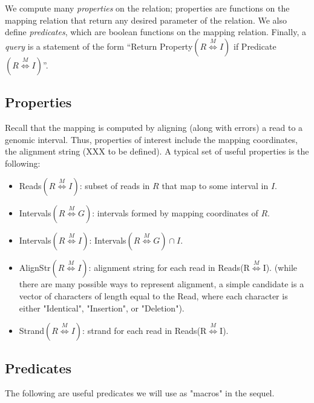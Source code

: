 \documentclass[10pt,fullpage]{article}
\newcommand{\MapRel}{\ensuremath{\stackrel{M}{\Leftrightarrow}}}
\begin{document}
We compute many \emph{properties} on the relation; properties
are functions on the mapping relation that return any desired
parameter of the relation.  
We also define \emph{predicates}, which are boolean functions on 
the mapping relation. Finally, a
\emph{query} is a statement of the form ``Return {\sc
  Property}$(R\MapRel I)$ if {\sc Predicate}$(R\MapRel I)$''.

\subsection{Properties}
Recall that the mapping is computed by aligning (along with errors) a
read to a genomic interval. Thus, properties of interest include the
mapping coordinates, the alignment string (XXX to be defined). A
typical set of useful properties is the following:
\begin{itemize}
\item {\sc Reads}$(R\MapRel I)$: subset of reads in $R$ that map to some interval in $I$.
\item {\sc Intervals}$(R\MapRel G)$: intervals formed by mapping coordinates of $R$.
\item {\sc Intervals}$(R\MapRel I)$: {\sc Intervals}$(R\MapRel G)\cap I$.
\item {\sc AlignStr}$(R\MapRel I)$: alignment string for each 
read in {\sc Reads}(R\MapRel I).  (while there are many possible
ways to represent alignment, a simple candidate is a vector
of characters of length equal to the Read, where each character 
is either "Identical", "Insertion", or "Deletion").
\item {\sc Strand}$(R\MapRel I)$: strand for each read in {\sc Reads}(R\MapRel I).
\end{itemize}

\subsection{Predicates}

The following are useful predicates we will use as "macros"
in the sequel.
\end{document}
